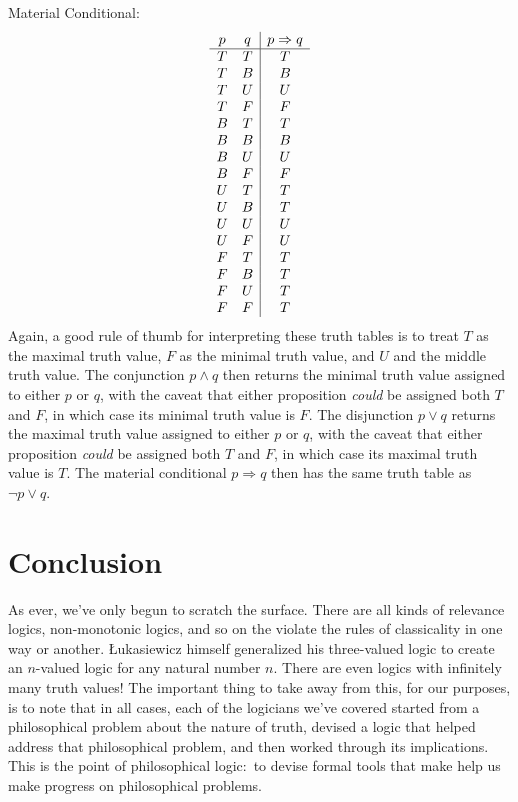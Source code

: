\documentclass[11pt]{article}
\theoremstyle{definition}
\theoremstyle{remark}
\begin{document}
Material Conditional:
\[
\begin{array}{c c|c}
p & q & p \Rightarrow q \\
\hline
T & T & T \\
T & B & B \\
T & U & U \\
T & F & F \\
B & T & T \\
B & B & B \\
B & U & U \\
B & F & F \\
U & T & T \\
U & B & T \\
U & U & U \\
U & F & U \\
F & T & T \\
F & B & T \\
F & U & T \\
F & F & T \\
\end{array}
\]
Again, a good rule of thumb for interpreting these truth tables is to treat $T$ as the maximal truth value, $F$ as the minimal truth value, and $U$ and the middle truth value. The conjunction $p\wedge q$ then returns the minimal truth value assigned to either $p$ or $q$, with the caveat that either proposition \textit{could} be assigned both $T$ and $F$, in which case its minimal truth value is $F$. The disjunction $p\vee q$ returns the maximal truth value assigned to either $p$ or $q$, with the caveat that either proposition \textit{could} be assigned both $T$ and $F$, in which case its maximal truth value is $T$. The material conditional $p\Rightarrow q$ then has the same truth table as $\neg p \vee q$.


\section{Conclusion}
As ever, we've only begun to scratch the surface. There are all kinds of relevance logics, non-monotonic logics, and so on the violate the rules of classicality in one way or another. Łukasiewicz himself generalized his three-valued logic to create an $n$-valued logic for any natural number $n$. There are even logics with infinitely many truth values! The important thing to take away from this, for our purposes, is to note that in all cases, each of the logicians we've covered started from a philosophical problem about the nature of truth, devised a logic that helped address that philosophical problem, and then worked through its implications. This is the point of philosophical logic:\ to devise formal tools that make help us make progress on philosophical problems. 
\end{document}
